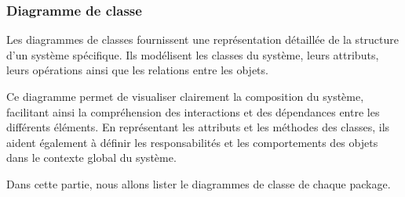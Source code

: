     \subsubsection{Diagramme de classe}
        \par Les diagrammes de classes fournissent une représentation détaillée de la structure d'un système spécifique.
        Ils modélisent les classes du système, leurs attributs, leurs opérations ainsi que les relations entre les objets\cite{diag_class}. 
        \par Ce diagramme permet de visualiser clairement la composition du système, facilitant ainsi la compréhension des interactions et des dépendances entre les différents éléments. 
        En représentant les attributs et les méthodes des classes, ils aident également à définir les responsabilités et les comportements des objets dans le contexte global du système.
        \par Dans cette partie, nous allons lister le diagrammes de classe de chaque package.

